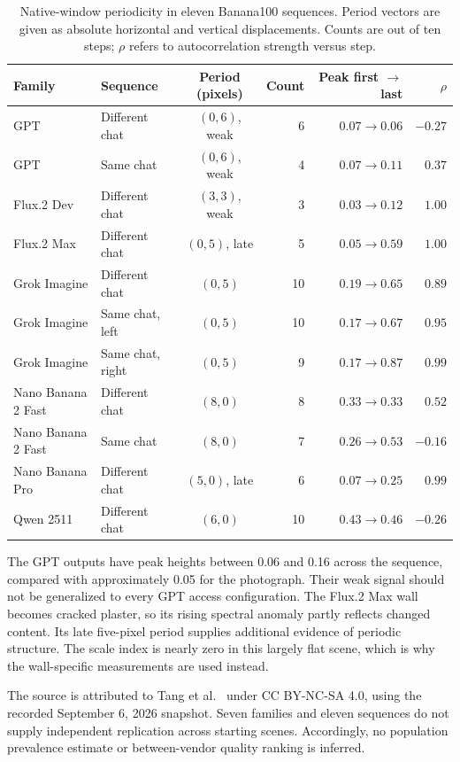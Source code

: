 \documentclass[sigplan,10pt,nonacm]{acmart}
\begin{document}
\begin{table}[t]
\caption{Native-window periodicity in eleven Banana100 sequences. Period vectors are given as absolute horizontal and vertical displacements. Counts are out of ten steps; $\rho$ refers to autocorrelation strength versus step.}
\label{tab:external}
\centering\small
\begin{tabular}{llcrrr}
\toprule
Family & Sequence & Period (pixels) & Count & Peak first $\to$ last & $\rho$ \\
\midrule
GPT & Different chat & $(0,6)$, weak & 6 & $0.07\to0.06$ & $-0.27$ \\
GPT & Same chat & $(0,6)$, weak & 4 & $0.07\to0.11$ & $0.37$ \\
Flux.2 Dev & Different chat & $(3,3)$, weak & 3 & $0.03\to0.12$ & $1.00$ \\
Flux.2 Max & Different chat & $(0,5)$, late & 5 & $0.05\to0.59$ & $1.00$ \\
Grok Imagine & Different chat & $(0,5)$ & 10 & $0.19\to0.65$ & $0.89$ \\
Grok Imagine & Same chat, left & $(0,5)$ & 10 & $0.17\to0.67$ & $0.95$ \\
Grok Imagine & Same chat, right & $(0,5)$ & 9 & $0.17\to0.87$ & $0.99$ \\
Nano Banana 2 Fast & Different chat & $(8,0)$ & 8 & $0.33\to0.33$ & $0.52$ \\
Nano Banana 2 Fast & Same chat & $(8,0)$ & 7 & $0.26\to0.53$ & $-0.16$ \\
Nano Banana Pro & Different chat & $(5,0)$, late & 6 & $0.07\to0.25$ & $0.99$ \\
Qwen 2511 & Different chat & $(6,0)$ & 10 & $0.43\to0.46$ & $-0.26$ \\
\bottomrule
\end{tabular}
\end{table}

The GPT outputs have peak heights between 0.06 and 0.16 across the sequence, compared with approximately 0.05 for the photograph. Their weak signal should not be generalized to every GPT access configuration. The Flux.2 Max wall becomes cracked plaster, so its rising spectral anomaly partly reflects changed content. Its late five-pixel period supplies additional evidence of periodic structure. The scale index is nearly zero in this largely flat scene, which is why the wall-specific measurements are used instead.

The source is attributed to Tang et al.~\cite{banana100data} under CC BY-NC-SA 4.0, using the recorded September 6, 2026 snapshot. Seven families and eleven sequences do not supply independent replication across starting scenes. Accordingly, no population prevalence estimate or between-vendor quality ranking is inferred.
\end{document}
